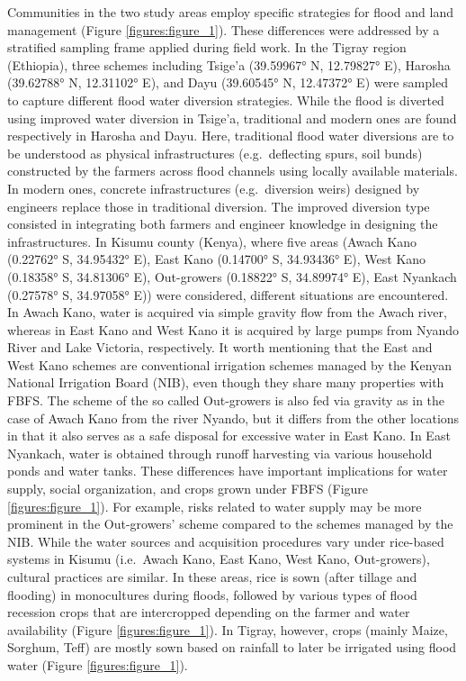 \documentclass[12pt,oneside]{article}
\begin{document}
Communities in the two study areas employ specific strategies for flood
and land management (Figure \ref{figures:figure_1}). These differences
were addressed by a stratified sampling frame applied during field work.
In the Tigray region (Ethiopia), three schemes including Tsige'a
(39.59967° N, 12.79827° E), Harosha (39.62788° N, 12.31102° E), and Dayu
(39.60545° N, 12.47372° E) were sampled to capture different flood water
diversion strategies. While the flood is diverted using improved water
diversion in Tsige'a, traditional and modern ones are found respectively
in Harosha and Dayu. Here, traditional flood water diversions are to be
understood as physical infrastructures (e.g.~deflecting spurs, soil
bunds) constructed by the farmers across flood channels using locally
available materials. In modern ones, concrete infrastructures
(e.g.~diversion weirs) designed by engineers replace those in
traditional diversion. The improved diversion type consisted in
integrating both farmers and engineer knowledge in designing the
infrastructures. In Kisumu county (Kenya), where five areas (Awach Kano
(0.22762° S, 34.95432° E), East Kano (0.14700° S, 34.93436° E), West
Kano (0.18358° S, 34.81306° E), Out-growers (0.18822° S, 34.89974° E),
East Nyankach (0.27578° S, 34.97058° E)) were considered, different
situations are encountered. In Awach Kano, water is acquired via simple
gravity flow from the Awach river, whereas in East Kano and West Kano it
is acquired by large pumps from Nyando River and Lake Victoria,
respectively. It worth mentioning that the East and West Kano schemes
are conventional irrigation schemes managed by the Kenyan National
Irrigation Board (NIB), even though they share many properties with
FBFS. The scheme of the so called Out-growers is also fed via gravity as
in the case of Awach Kano from the river Nyando, but it differs from the
other locations in that it also serves as a safe disposal for excessive
water in East Kano. In East Nyankach, water is obtained through runoff
harvesting via various household ponds and water tanks. These
differences have important implications for water supply, social
organization, and crops grown under FBFS (Figure
\ref{figures:figure_1}). For example, risks related to water supply may
be more prominent in the Out-growers' scheme compared to the schemes
managed by the NIB. While the water sources and acquisition procedures
vary under rice-based systems in Kisumu (i.e.~Awach Kano, East Kano,
West Kano, Out-growers), cultural practices are similar. In these areas,
rice is sown (after tillage and flooding) in monocultures during floods,
followed by various types of flood recession crops that are intercropped
depending on the farmer and water availability (Figure
\ref{figures:figure_1}). In Tigray, however, crops (mainly Maize,
Sorghum, Teff) are mostly sown based on rainfall to later be irrigated
using flood water (Figure \ref{figures:figure_1}).
\end{document}
